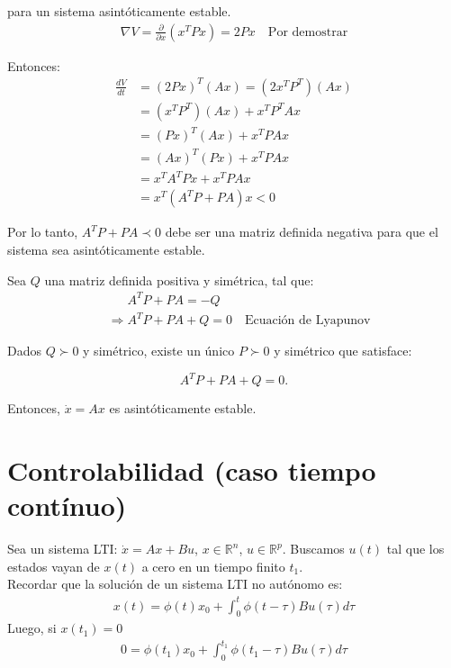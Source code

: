 para un sistema asintóticamente estable.\\
\begin{align*}
    \nabla V=\frac{\partial}{\partial {x}} ({x}^T {P}{x}) = 2{P}{x} \quad \text{Por demostrar}
\end{align*}

Entonces:
\begin{align*}
    \frac{dV}{dt} &= (2Px)^T (Ax)= (2x^T P^T)(Ax)\\
    &= (x^T P^T)(Ax)+x^T P^T Ax\\
    &= (Px)^T(Ax)+x^T PAx\\
    &= (Ax)^T(Px)+x^T PAx\\
    &= x^T A^T Px+x^T PAx\\
    &= x^T (A^T P+PA)x<0
\end{align*}

Por lo tanto, $A^T P+PA \prec 0$ debe ser una matriz definida negativa para que el sistema sea asintóticamente estable.\\
\par Sea $Q$ una matriz definida positiva y simétrica, tal que:
\begin{align*}
    &\phantom{\Longrightarrow} A^T P+PA = -Q\\
    &\Longrightarrow A^T P + P A + Q = 0 \quad \text{Ecuación de Lyapunov}
\end{align*}

\begin{theorem}
    Dados $Q \succ 0$ y simétrico, existe un único $P\succ 0$ y simétrico que satisface:

    $$A^T P + P A + Q = 0.$$

Entonces, $\dot{x}=Ax$ es asintóticamente estable.
\end{theorem}

\section{Controlabilidad (caso tiempo contínuo)}

Sea un sistema LTI: $\dot{x}=Ax+Bu$, $x\in \mathbb{R}^n$, $u\in\mathbb{R}^p$. Buscamos $u(t)$ tal que los estados vayan de $x(t)$ a cero en un tiempo finito $t_1$. \\
Recordar que la solución de un sistema LTI no autónomo es:
\begin{align*}
    x(t)=\phi(t)x_0+\int_0^t \phi(t-\tau)Bu(\tau)d\tau    
\end{align*}
Luego, si $x(t_1) = 0$
\begin{align*}
    0=\phi(t_1)x_0+\int_0^{t_1} \phi(t_1-\tau)Bu(\tau)d\tau
\end{align*}

